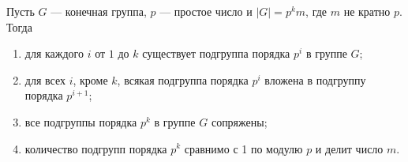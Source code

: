 \begin{theorem}[Силов] \label{Sylow}
	Пусть $ G $ --- конечная группа, $ p $ --- простое число и $ |G| = p^km $, где $ m $ не кратно $ p $.
	Тогда
	\begin{enumerate}
		\item для каждого $ i $ от $ 1 $ до $ k $ существует подгруппа порядка $ p^i $ в группе $ G $;
		
		\item для всех $ i $, кроме $ k $, всякая подгруппа порядка $ p^{i} $ 
		вложена в подгруппу порядка $ p^{i + 1} $;
		
		\item все подгруппы порядка $ p^k $ в группе $ G $ сопряжены;
		
		\item количество подгрупп порядка $ p^k $ сравнимо с 1 по модулю $ p $ и делит число $ m $.
	\end{enumerate}
\end{theorem}

